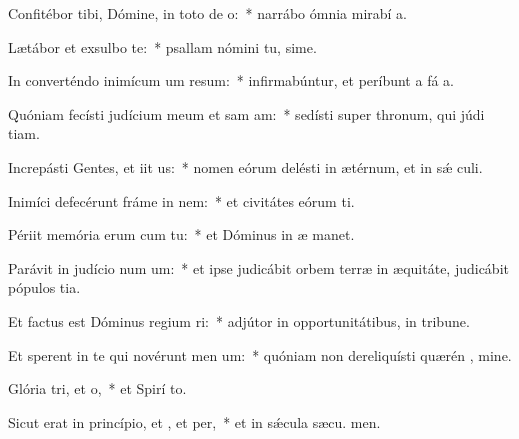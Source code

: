 \item Confitébor tibi, Dómine, in toto de o:~* narrábo ómnia mirabí a.
\item Lætábor et exsulbo  te:~* psallam nómini tu, sime.
\item In converténdo inimícum um resum:~* infirmabúntur, et períbunt a fá a.
\item Quóniam fecísti judícium meum et sam am:~* sedísti super thronum, qui júdi tiam.
\item Increpásti Gentes, et iit us:~* nomen eórum delésti in ætérnum, et in sǽ culi.
\item Inimíci defecérunt fráme in nem:~* et civitátes eórum ti.
\item Périit memória erum cum tu:~* et Dóminus in æ manet.
\item Parávit in judício num um:~* et ipse judicábit orbem terræ in æquitáte, judicábit pópulos  tia.
\item Et factus est Dóminus regium ri:~* adjútor in opportunitátibus, in tribune.
\item Et sperent in te qui novérunt men um:~* quóniam non dereliquísti quærén , mine.
\item Glória tri, et o,~* et Spirí to.
\item Sicut erat in princípio, et , et per,~* et in sǽcula sæcu. men.

